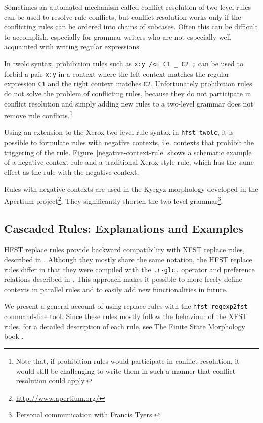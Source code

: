 \documentclass{llncs}
\begin{document}
Sometimes an automated mechanism called conflict resolution of
two-level rules~\cite{silfverberg/2009/2} can be used to resolve rule
conflicts, but conflict resolution works only if the conflicting rules
can be ordered into chains of subcases. Often this can be difficult
to accomplish, especially for grammar writers who are not especially
well acquainted with writing regular expressions.

In twolc syntax, prohibition rules such as {\tt x:y /<= C1 \_ C2 ;}
can be used to forbid a pair {\tt x:y} in a context where the left
context matches the regular expression {\tt C1} and the right context
matches {\tt C2}. Unfortunately prohibition rules do not solve the
problem of conflicting rules, because they do not participate in conflict
resolution and simply adding new rules to a two-level grammar does not
remove rule conflicts.\footnote{Note that, if prohibition rules would
  participate in conflict resolution, it would still be challenging to
  write them in such a manner that conflict resolution could apply.}

Using an extension to the Xerox two-level rule syntax in
\verb|hfst-twolc|, it is possible to formulate rules with negative
contexts, i.e. contexts that prohibit the triggering of the
rule. Figure~\ref{negative-context-rule} shows a schematic example of
a negative context rule and a traditional Xerox style rule, which has
the same effect as the rule with the negative context.

Rules with negative contexts are used in the Kyrgyz morphology
developed in the Apertium project\footnote{\url{http://www.apertium.org/}}.
They significantly shorten the two-level
grammar\footnote{Personal communication with Francis Tyers.}.


\subsection{Cascaded Rules: Explanations and Examples}

HFST replace rules provide backward compatibility with XFST replace rules, 
described in \cite{Kempe96parallelreplacement,beesley/2003}. 
Although they mostly share the same notation, the HFST replace rules differ in that
they were compiled with the \verb!.r-glc.! operator \cite{Gerdemann/1999} and preference
relations described in \cite{ylijyra/2008b}. This approach makes it possible to more freely
define contexts in parallel rules and to easily add new functionalities in future.

We present a general account of using replace rules with the \verb!hfst-regexp2fst!
command-line tool. Since these rules mostly follow the behaviour of the XFST rules,
for a detailed description of each rule, see The Finite State Morphology book \cite{beesley/2003}.
\end{document}
